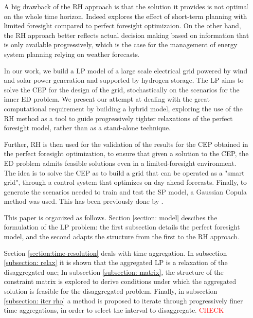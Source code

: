 A big drawback of the RH approach is that the solution it provides is not optimal on the whole time horizon. 
Indeed \textcolor{green}{\cite{INTRO_short-term}} explores the effect of short-term planning with limited foresight
 compared to perfect foresight optimizaion. 
On the other hand, the RH approach better reflects actual decision making based on information that is only available
 progressively, which is the case for the management of energy system planning relying on weather forecasts.

In our work, we build a LP model of a large scale electrical grid powered by wind and solar power generation and supported
 by hydrogen storage. 
The LP aims to solve the CEP for the design of the grid, stochastically on the scenarios for the inner ED problem. 
We present our attempt at dealing with the great computational requirement by building a hybrid model, exploring the use of
 the RH method as a tool to guide progressively tighter relaxations of the perfect foresight model, rather than as a 
 stand-alone technique. 

Further, RH is then used for the validation of the results for the CEP obtained in the perfect foresight optimization,
 to ensure that given a solution to the CEP, the ED problem admits feasible solutions even in a limited-foresight environment. 
The idea is to solve the CEP as to build a grid that can be operated as a "smart grid", through a control system that
 optimizes on day ahead forecasts.
{
\color{gray}
Finally, to generate the scenarios needed to train and test the SP model, a Gaussian Copula method was used. 
This has been previously done by \textcolor{violet}{\cite{INTRO_GaussCopula}}.
}

\color{black}

This paper is organized as follows. 
Section \ref{section: model} descibes the formulation of the LP problem: the first subsection details the perfect foresight model, and the second adapts the structure from the first to the RH approach. 

Section \ref{section:time-resolution} deals with time aggregation. In subsection \ref{subsection: relax} it is shown that the aggregated LP is a relaxation of the disaggregated one; 
In subsection \ref{subsection: matrix}, the structure of the constraint matrix is explored to derive conditions under which the aggregated solution is feasible for the disaggregated problem. 
Finally, in subsection \ref{subsection: iter rho} a method is proposed to iterate through progressively finer time aggregations, in order to select the interval to disaggregate. 
\textcolor{red}{CHECK}

